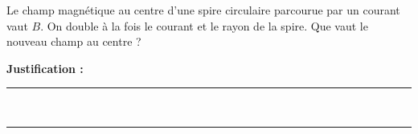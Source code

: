 Le champ magnétique au centre d'une spire circulaire parcourue par un courant vaut $B$. On double à la fois le courant et le rayon de la spire. Que vaut le nouveau champ au centre ?

\choices

\noindent\textbf{Justification :} \hrulefill \\[2.5ex]
\rule{\linewidth}{0.4pt} \\[2.5ex]
\rule{\linewidth}{0.4pt}
\vfill
